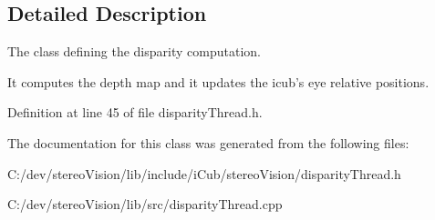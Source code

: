 \subsection{Detailed Description}
The class defining the disparity computation. 

It computes the depth map and it updates the icub's eye relative positions. 

Definition at line 45 of file disparity\+Thread.\+h.



The documentation for this class was generated from the following files\+:\begin{DoxyCompactItemize}
\item 
C\+:/dev/stereo\+Vision/lib/include/i\+Cub/stereo\+Vision/disparity\+Thread.\+h\item 
C\+:/dev/stereo\+Vision/lib/src/disparity\+Thread.\+cpp\end{DoxyCompactItemize}
